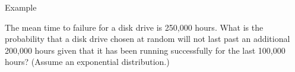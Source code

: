 \begin{frame}{Example}

  The mean time to failure for a disk drive is 250,000 hours. What is
  the probability that a disk drive chosen at random will not last
  past an additional 200,000 hours given that it has been running
  successfully for the last 100,000 hours? (Assume an exponential
  distribution.)
  
\end{frame}


